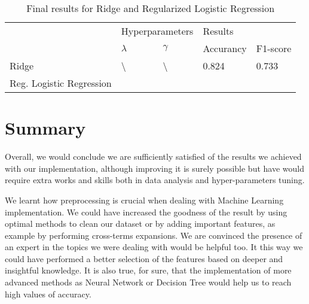 \documentclass[10pt,article]{IEEEtran}
\begin{document}
\begin{table}[!h]
\centering
\label{tab:finalresults}
\begin{tabular}{l|l|l|l|l|} 
\cline{2-5}
                                               & \multicolumn{2}{l|}{Hyperparameters} & \multicolumn{2}{l|}{Results}  \\ 
\cline{2-5}
                                               & $\lambda$        & $\gamma$          & Accurancy & F1-score          \\ 
\hline
\multicolumn{1}{|l|}{Ridge}                    & \textbackslash{} & \textbackslash{}  & 0.824     & 0.733             \\ 
\cline{1-1}
\multicolumn{1}{|l|}{Reg. Logistic Regression} &                  &                   &           &                   \\
\hline
\end{tabular}
\caption{Final results for Ridge and Regularized Logistic Regression }
\vspace{-0.5cm}
\end{table}


\section{Summary}

Overall, we would conclude we are sufficiently satisfied of the results we achieved with our implementation, although improving it is surely possible but have would require extra works and skills both in data analysis and hyper-parameters tuning. 

We learnt how preprocessing is crucial when dealing with Machine Learning implementation. We could have increased the goodness of the result by using optimal methods to clean our dataset or by adding important features, as example by performing cross-terms expansions. We are convinced the presence of an expert in the topics we were dealing with would be helpful too. It this way we could have performed a better selection of the features based on deeper and insightful knowledge. It is also true, for sure, that the implementation of more advanced methods as Neural Network or Decision Tree would help us to reach high values of accuracy.




\end{document}
